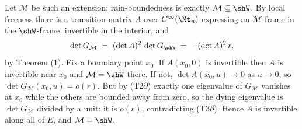 Let $\mathcal{M}$ be such an extension; rain-boundedness is exactly $\mathcal{M} \subseteq \shW$. By local freeness there is a transition matrix $A$ over $C^\infty(\Mt_u)$ expressing an $\mathcal{M}$-frame in the $\shW$-frame, invertible in the interior, and
\[
\det G_{\mathcal{M}} \;=\; (\det A)^2 \,\det G_{\shW} \;=\; -(\det A)^2\, r ,
\]
by Theorem (1). Fix a boundary point $x_0$. If $A(x_0, 0)$ is invertible then $A$ is invertible near $x_0$ and $\mathcal{M} = \shW$ there. If not, $\det A(x_0, u) \to 0$ as $u \to 0$, so $\det G_{\mathcal{M}}(x_0, u) = o(r)$. But by (T2$\partial$) exactly one eigenvalue of $G_{\mathcal{M}}$ vanishes at $x_0$ while the others are bounded away from zero, so the dying eigenvalue is $\det G_{\mathcal{M}}$ divided by a unit: it is $o(r)$, contradicting (T3$\partial$). Hence $A$ is invertible along all of $E$, and $\mathcal{M} = \shW$.
